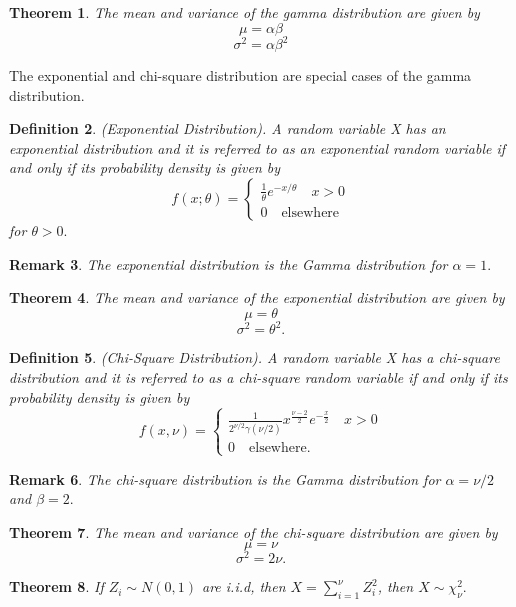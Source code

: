 \documentclass[twoside]{article}
\newcounter{lecnum}
\newtheorem{theorem}{Theorem}[lecnum]
\newtheorem{definition}[theorem]{Definition}
\newtheorem{remark}[theorem]{Remark}
\begin{document}
\begin{theorem}The mean and variance of the gamma distribution are given by 
$$
\mu = \alpha \beta
$$ 
$$
\sigma^2 = \alpha \beta^2
$$
\end{theorem}

The exponential and chi-square distribution are special cases of the gamma distribution.

\begin{definition}(Exponential Distribution). A random variable X has an exponential distribution and it is referred to as an exponential random variable if and only if its probability density is given by 
$$
f(x; \theta) = \begin{cases}
\frac{1}{\theta}e^{-x/\theta} \quad x > 0\\
0 \quad \text{elsewhere}
\end{cases}
$$
for $\theta > 0.$
\end{definition}

\begin{remark}The exponential distribution is the Gamma distribution for $\alpha = 1.$
\end{remark}

\begin{theorem}
The mean and variance of the exponential distribution are given by 
$$
\mu = \theta
$$
$$
\sigma^2 = \theta^2.
$$
\end{theorem}

\begin{definition}(Chi-Square Distribution). A random variable X has a chi-square distribution and it is referred to as a chi-square random variable if and only if its probability density is given by 
$$
f(x, \nu) = \begin{cases}
\frac{1}{2^{\nu/2}\gamma(\nu/2)}x^{\frac{\nu - 2}{2}}e^{-\frac{x}{2}} \quad x > 0\\
0 \quad \text{elsewhere}.
\end{cases}
$$
\end{definition}
\begin{remark}The chi-square distribution is the Gamma distribution for $\alpha = \nu/2$ and $\beta = 2.$
\end{remark}
\begin{theorem}The mean and variance of the chi-square distribution are given by 
$$
\mu = \nu
$$
$$
\sigma^2 = 2\nu.
$$
\end{theorem}

\begin{theorem}If $Z_i \sim N(0,1)$ are i.i.d, then $X = \sum_{i=1}^{\nu}Z_{i}^{2}$, then $X \sim \chi_{\nu}^{2}.$
\end{theorem}
\end{document}
